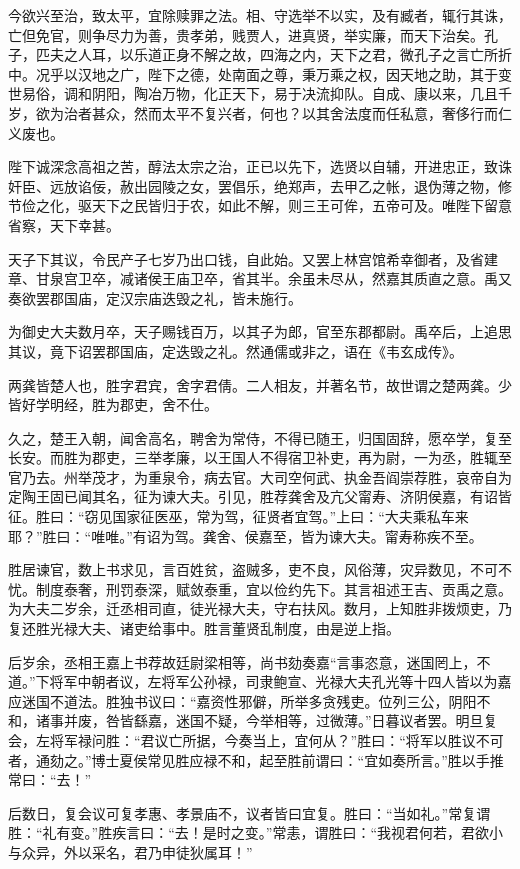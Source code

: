 \documentclass[]{article}
\begin{document}
今欲兴至治，致太平，宜除赎罪之法。相、守选举不以实，及有臧者，辄行其诛，亡但免官，则争尽力为善，贵孝弟，贱贾人，进真贤，举实廉，而天下治矣。孔子，匹夫之人耳，以乐道正身不解之故，四海之内，天下之君，微孔子之言亡所折中。况乎以汉地之广，陛下之德，处南面之尊，秉万乘之权，因天地之助，其于变世易俗，调和阴阳，陶冶万物，化正天下，易于决流抑队。自成、康以来，几且千岁，欲为治者甚众，然而太平不复兴者，何也？以其舍法度而任私意，奢侈行而仁义废也。

陛下诚深念高祖之苦，醇法太宗之治，正已以先下，选贤以自辅，开进忠正，致诛奸臣、远放谄佞，赦出园陵之女，罢倡乐，绝郑声，去甲乙之帐，退伪薄之物，修节俭之化，驱天下之民皆归于农，如此不解，则三王可侔，五帝可及。唯陛下留意省察，天下幸甚。

天子下其议，令民产子七岁乃出口钱，自此始。又罢上林宫馆希幸御者，及省建章、甘泉宫卫卒，减诸侯王庙卫卒，省其半。余虽未尽从，然嘉其质直之意。禹又奏欲罢郡国庙，定汉宗庙迭毁之礼，皆未施行。

为御史大夫数月卒，天子赐钱百万，以其子为郎，官至东郡都尉。禹卒后，上追思其议，竟下诏罢郡国庙，定迭毁之礼。然通儒或非之，语在《韦玄成传》。

两龚皆楚人也，胜字君宾，舍字君倩。二人相友，并著名节，故世谓之楚两龚。少皆好学明经，胜为郡吏，舍不仕。

久之，楚王入朝，闻舍高名，聘舍为常侍，不得已随王，归国固辞，愿卒学，复至长安。而胜为郡吏，三举孝廉，以王国人不得宿卫补吏，再为尉，一为丞，胜辄至官乃去。州举茂才，为重泉令，病去官。大司空何武、执金吾阎崇荐胜，哀帝自为定陶王固已闻其名，征为谏大夫。引见，胜荐龚舍及亢父甯寿、济阴侯嘉，有诏皆征。胜曰：``窃见国家征医巫，常为驾，征贤者宜驾。''上曰：``大夫乘私车来耶？''胜曰：``唯唯。''有诏为驾。龚舍、侯嘉至，皆为谏大夫。甯寿称疾不至。

胜居谏官，数上书求见，言百姓贫，盗贼多，吏不良，风俗薄，灾异数见，不可不忧。制度泰奢，刑罚泰深，赋敛泰重，宜以俭约先下。其言祖述王吉、贡禹之意。为大夫二岁余，迁丞相司直，徒光禄大夫，守右扶风。数月，上知胜非拨烦吏，乃复还胜光禄大夫、诸吏给事中。胜言董贤乱制度，由是逆上指。

后岁余，丞相王嘉上书荐故廷尉梁相等，尚书劾奏嘉``言事恣意，迷国罔上，不道。''下将军中朝者议，左将军公孙禄，司隶鲍宣、光禄大夫孔光等十四人皆以为嘉应迷国不道法。胜独书议曰：``嘉资性邪僻，所举多贪残吏。位列三公，阴阳不和，诸事并废，咎皆繇嘉，迷国不疑，今举相等，过微薄。''日暮议者罢。明旦复会，左将军禄问胜：``君议亡所据，今奏当上，宜何从？''胜曰：``将军以胜议不可者，通劾之。''博士夏侯常见胜应禄不和，起至胜前谓曰：``宜如奏所言。''胜以手推常曰：``去！''

后数日，复会议可复孝惠、孝景庙不，议者皆曰宜复。胜曰：``当如礼。''常复谓胜：``礼有变。''胜疾言曰：``去！是时之变。''常恚，谓胜曰：``我视君何若，君欲小与众异，外以采名，君乃申徒狄属耳！''
\end{document}
